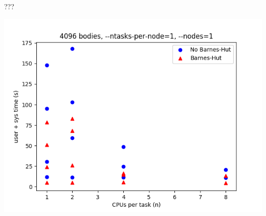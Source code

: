 \documentclass{beamer}
\begin{document}
\begin{frame}[allowframebreaks]{???}
\framebreak

\includegraphics[width=\linewidth]{scaling}

\end{frame}
\end{document}

